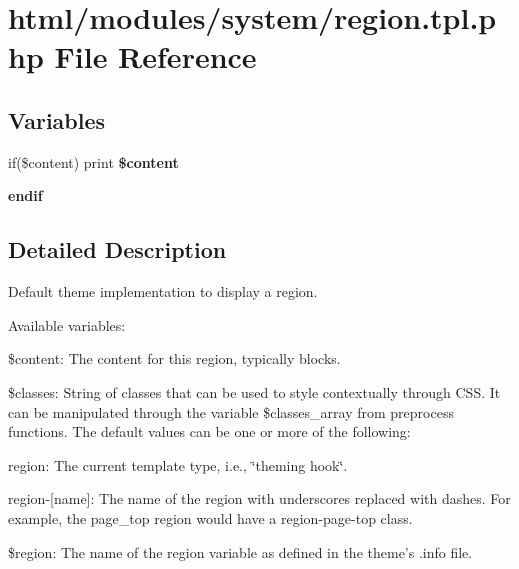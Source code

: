 \hypertarget{region_8tpl_8php}{
\section{html/modules/system/region.tpl.php File Reference}
\label{region_8tpl_8php}
}
\subsection*{Variables}
\begin{DoxyCompactItemize}
\item 
\hypertarget{region_8tpl_8php_a415d98ef8ba9211cd6b7d38158496575}{
if(\$content) print {\bfseries \$content}}
\label{region_8tpl_8php_a415d98ef8ba9211cd6b7d38158496575}

\item 
\hypertarget{region_8tpl_8php_a82cd33ca97ff99f2fcc5e9c81d65251b}{
{\bfseries endif}}
\label{region_8tpl_8php_a82cd33ca97ff99f2fcc5e9c81d65251b}

\end{DoxyCompactItemize}


\subsection{Detailed Description}
Default theme implementation to display a region.

Available variables:
\begin{DoxyItemize}
\item \$content: The content for this region, typically blocks.
\item \$classes: String of classes that can be used to style contextually through CSS. It can be manipulated through the variable \$classes\_\-array from preprocess functions. The default values can be one or more of the following:
\begin{DoxyItemize}
\item region: The current template type, i.e., \char`\"{}theming hook\char`\"{}.
\item region-\/\mbox{[}name\mbox{]}: The name of the region with underscores replaced with dashes. For example, the page\_\-top region would have a region-\/page-\/top class.
\end{DoxyItemize}
\item \$region: The name of the region variable as defined in the theme's .info file.
\end{DoxyItemize}


